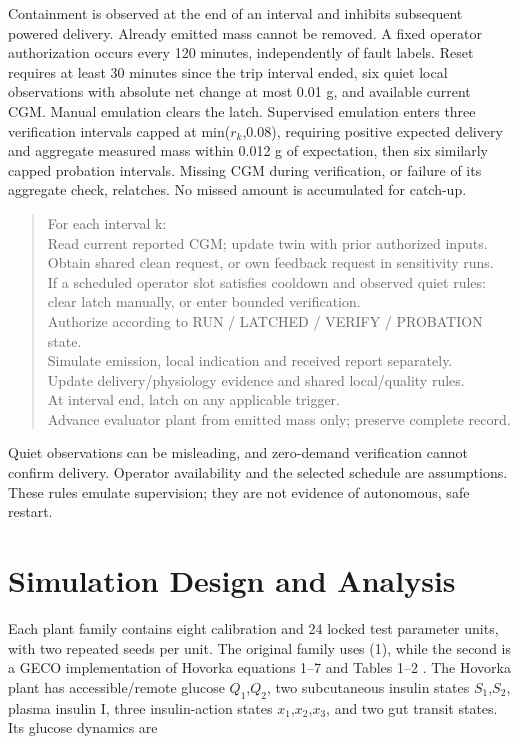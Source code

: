 \documentclass[journal,10pt,letterpaper]{IEEEtran}
\begin{document}
Containment is observed at the end of an interval and inhibits
subsequent powered delivery. Already emitted mass cannot be removed. A
fixed operator authorization occurs every 120 minutes, independently of
fault labels. Reset requires at least 30 minutes since the trip interval
ended, six quiet local observations with absolute net change at most
0.01 g, and available current CGM. Manual emulation clears the latch.
Supervised emulation enters three verification intervals capped at
min(\(r_k\),0.08), requiring positive expected delivery and aggregate
measured mass within 0.012 g of expectation, then six similarly capped
probation intervals. Missing CGM during verification, or failure of its
aggregate check, relatches. No missed amount is accumulated for
catch-up.

\begin{quote}\footnotesize\ttfamily\raggedright
For each interval k:\\
Read current reported CGM; update twin with prior authorized inputs.\\
Obtain shared clean request, or own feedback request in sensitivity runs.\\
If a scheduled operator slot satisfies cooldown and observed quiet rules:\\
clear latch manually, or enter bounded verification.\\
Authorize according to RUN / LATCHED / VERIFY / PROBATION state.\\
Simulate emission, local indication and received report separately.\\
Update delivery/physiology evidence and shared local/quality rules.\\
At interval end, latch on any applicable trigger.\\
Advance evaluator plant from emitted mass only; preserve complete record.\\
\end{quote}

Quiet observations can be misleading, and zero-demand verification
cannot confirm delivery. Operator availability and the selected schedule
are assumptions. These rules emulate supervision; they are not evidence
of autonomous, safe restart.

\section{Simulation Design and Analysis}

Each plant family contains eight calibration and 24 locked test
parameter units, with two repeated seeds per unit. The original family
uses (1), while the second is a GECO implementation of Hovorka equations
1--7 and Tables 1--2 \cite{R05}. The Hovorka plant has accessible/remote
glucose \(Q_1\),\(Q_2\), two subcutaneous insulin states
\(S_1\),\(S_2\), plasma insulin I, three insulin-action states
\(x_1\),\(x_2\),\(x_3\), and two gut transit states. Its glucose
dynamics are
\end{document}
